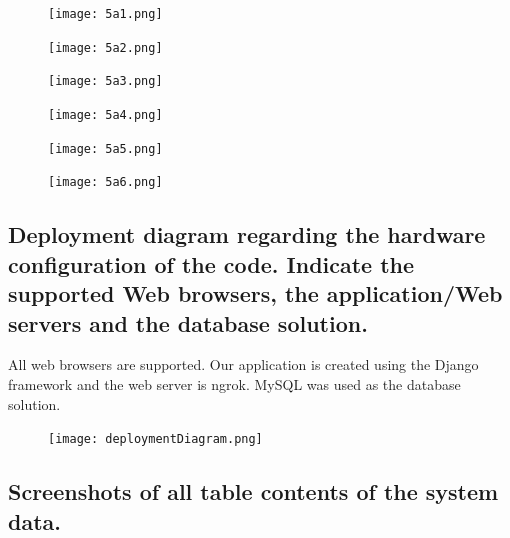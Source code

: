 \documentclass[letterpaper, 12 pt, conference]{ieeeconf}
\begin{document}
\begin{figure}[h]
        \centering
        \texttt{[image: 5a1.png]}
\end{figure}
\begin{figure}[h]
        \centering
        \texttt{[image: 5a2.png]}
\end{figure}
\begin{figure}[h]
        \centering
        \texttt{[image: 5a3.png]}
\end{figure}
\begin{figure}[h]
        \centering
        \texttt{[image: 5a4.png]}
\end{figure}
\begin{figure}[h]
        \centering
        \texttt{[image: 5a5.png]}
\end{figure}
\begin{figure}[h]
        \centering
        \texttt{[image: 5a6.png]}
\end{figure}

\linebreak
    \hfill \break
    \clearpage
\subsection{Deployment diagram regarding the hardware configuration of the code. Indicate the supported Web browsers, the application/Web servers and the database solution.}

All web browsers are supported. Our application is created using the Django framework and the web server is ngrok. MySQL was used as the database solution.

\begin{figure}[h]
        \centering
        \texttt{[image: deploymentDiagram.png]}
\end{figure}

\linebreak
\clearpage    
\subsection{Screenshots of all table contents of the system data.}
\end{document}
